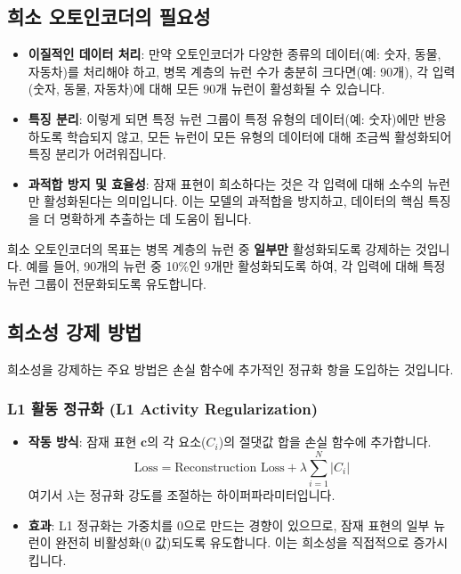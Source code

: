 \documentclass[11pt,a4paper]{article}
\theoremstyle{definition}
\begin{document}
\subsection{희소 오토인코더의 필요성}
\begin{itemize}
    \item \textbf{이질적인 데이터 처리}: 만약 오토인코더가 다양한 종류의 데이터(예: 숫자, 동물, 자동차)를 처리해야 하고, 병목 계층의 뉴런 수가 충분히 크다면(예: 90개), 각 입력(숫자, 동물, 자동차)에 대해 모든 90개 뉴런이 활성화될 수 있습니다.
    \item \textbf{특징 분리}: 이렇게 되면 특정 뉴런 그룹이 특정 유형의 데이터(예: 숫자)에만 반응하도록 학습되지 않고, 모든 뉴런이 모든 유형의 데이터에 대해 조금씩 활성화되어 특징 분리가 어려워집니다.
    \item \textbf{과적합 방지 및 효율성}: 잠재 표현이 희소하다는 것은 각 입력에 대해 소수의 뉴런만 활성화된다는 의미입니다. 이는 모델의 과적합을 방지하고, 데이터의 핵심 특징을 더 명확하게 추출하는 데 도움이 됩니다.
\end{itemize}

\begin{infobox}
희소 오토인코더의 목표는 병목 계층의 뉴런 중 \textbf{일부만} 활성화되도록 강제하는 것입니다. 예를 들어, 90개의 뉴런 중 10\%인 9개만 활성화되도록 하여, 각 입력에 대해 특정 뉴런 그룹이 전문화되도록 유도합니다.
\end{infobox}

\subsection{희소성 강제 방법}
희소성을 강제하는 주요 방법은 손실 함수에 추가적인 정규화 항을 도입하는 것입니다.

\subsubsection{L1 활동 정규화 (L1 Activity Regularization)}
\begin{itemize}
    \item \textbf{작동 방식}: 잠재 표현 $\mathbf{c}$의 각 요소($C_i$)의 절댓값 합을 손실 함수에 추가합니다.
        \begin{equation*}
        \text{Loss} = \text{Reconstruction Loss} + \lambda \sum_{i=1}^{N} |C_i|
        \end{equation*}
        여기서 $\lambda$는 정규화 강도를 조절하는 하이퍼파라미터입니다.
    \item \textbf{효과}: L1 정규화는 가중치를 0으로 만드는 경향이 있으므로, 잠재 표현의 일부 뉴런이 완전히 비활성화(0 값)되도록 유도합니다. 이는 희소성을 직접적으로 증가시킵니다.
\end{itemize}
\end{document}
